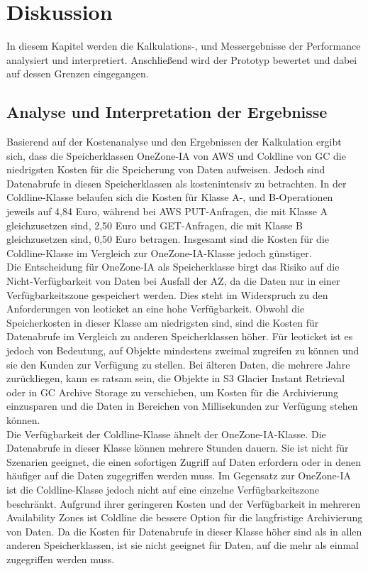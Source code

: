 \chapter{Diskussion}

In diesem Kapitel werden die Kalkulations-, und Messergebnisse der Performance analysiert und interpretiert. Anschließend wird der Prototyp bewertet und dabei auf dessen Grenzen eingegangen.
  
\section{Analyse und Interpretation der Ergebnisse}

Basierend auf der Kostenanalyse und den Ergebnissen der Kalkulation ergibt sich, dass die Speicherklassen OneZone-IA von AWS und Coldline von GC die niedrigsten Kosten für die Speicherung von Daten aufweisen. Jedoch sind Datenabrufe in diesen Speicherklassen als kostenintensiv zu betrachten. In der Coldline-Klasse belaufen sich die Kosten für Klasse A-, und B-Operationen jeweils auf 4,84 Euro, während bei AWS PUT-Anfragen, die mit Klasse A gleichzusetzen sind, 2,50 Euro und GET-Anfragen, die mit Klasse B gleichzusetzen sind, 0,50 Euro betragen. Insgesamt sind die Kosten für die Coldline-Klasse im Vergleich zur OneZone-IA-Klasse jedoch günstiger.\\ 


Die Entscheidung für OneZone-IA als Speicherklasse birgt das Risiko auf die Nicht-Verfügbarkeit von Daten bei Ausfall der AZ, da die Daten nur in einer Verfügbarkeitszone gespeichert werden. Dies steht im Widerspruch zu den Anforderungen von leoticket an eine hohe Verfügbarkeit. Obwohl die Speicherkosten in dieser Klasse am niedrigsten sind, sind die Kosten für Datenabrufe im Vergleich zu anderen Speicherklassen höher. Für leoticket ist es jedoch von Bedeutung, auf Objekte mindestens zweimal zugreifen zu können und sie den Kunden zur Verfügung zu stellen. Bei älteren Daten, die mehrere Jahre zurückliegen, kann es ratsam sein, die Objekte in S3 Glacier Instant Retrieval oder in GC Archive Storage zu verschieben, um Kosten für die Archivierung einzusparen und die Daten in Bereichen von Millisekunden zur Verfügung stehen können.\\

Die Verfügbarkeit der Coldline-Klasse ähnelt der OneZone-IA-Klasse. Die Datenabrufe in dieser Klasse können mehrere Stunden dauern. Sie ist nicht für Szenarien geeignet, die einen sofortigen Zugriff auf Daten erfordern oder in denen häufiger auf die Daten zugegriffen werden muss. Im Gegensatz zur OneZone-IA ist die Coldline-Klasse jedoch nicht auf eine einzelne Verfügbarkeitszone beschränkt. Aufgrund ihrer geringeren Kosten und der Verfügbarkeit in mehreren Availability Zones ist Coldline die bessere Option für die langfristige Archivierung von Daten. Da die Kosten für Datenabrufe in dieser Klasse höher sind als in allen anderen Speicherklassen, ist sie nicht geeignet für Daten, auf die mehr als einmal zugegriffen werden muss.\\

